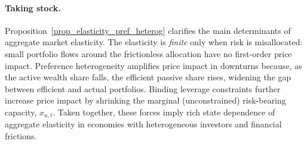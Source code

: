 \paragraph{Taking stock.}
Proposition~\ref{prop_elasticity_pref_heterog} clarifies the main determinants of aggregate market elasticity. The elasticity is \emph{finite} only when risk is misallocated: small portfolio flows around the frictionless allocation have no first-order price impact. Preference heterogeneity amplifies price impact in downturns because, as the active wealth share falls, the efficient passive share rises, widening the gap between efficient and actual portfolios. Binding leverage constraints further increase price impact by shrinking the marginal (unconstrained) risk-bearing capacity, $x_{u,t}$. Taken together, these forces imply rich state dependence of aggregate elasticity in economies with heterogeneous investors and financial frictions.







